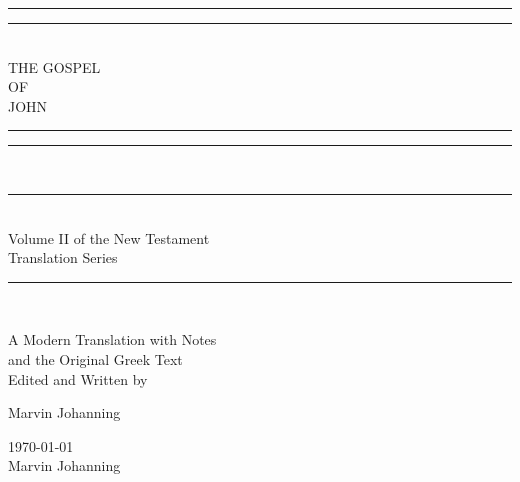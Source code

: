 \begin{doubletitle}
    \textheight
    \centering
    \vspace*{\baselineskip}
    \rule{\textwidth}{1.6pt}\vspace*{-\baselineskip}\vspace*{2pt}
    \rule{\textwidth}{0.4pt}\\[\baselineskip]
    {\LARGE THE GOSPEL \\ OF \\[0.3\baselineskip] JOHN }\\[0.2\baselineskip]
    \rule{\textwidth}{0.4pt}\vspace*{-\baselineskip}\vspace{3.2pt}
    \rule{\textwidth}{1.6pt}\\
    
    \scshape
    \rule{\textwidth}{0.4pt}\\[\baselineskip]
    {\Large Volume II of the New Testament \\ Translation Series }\\[0.2\baselineskip]
    \rule{\textwidth}{0.4pt}\vspace*{-\baselineskip}\vspace{3.2pt}\\[\baselineskip]\vspace*{2\baselineskip}
    
    A Modern Translation with Notes \\
    and the Original Greek Text \\
    \vspace*{2\baselineskip}
    Edited and Written by \\[\baselineskip]
    {\Large Marvin Johanning\par}
    \vfill
    {\scshape \monthyeardate\today} \\
    {\large Marvin Johanning}\par
\end{doubletitle}